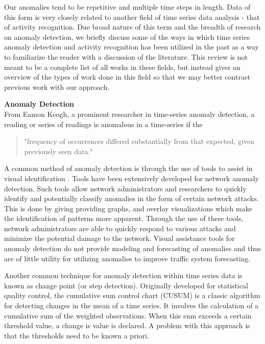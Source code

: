 Our anomalies tend to be repetitive and multiple time steps in length.  Data of this form is very closely related to another field of time series data analysis - that of activity recognition.   Due broad nature of this term and the breadth of research on anomaly detection, we briefly discuss some of the ways in which time series anomaly detection and activity recognition has been utilized in the past as a way to familiarize the reader with a discussion of the literature.  This review is not meant to be a complete list of all works in these fields, but instead gives an overview of the types of work done in this field so that we may better contrast previous work with our approach.

\bigskip
\noindent \textbf{Anomaly Detection} \\
From Eamon Keogh, a prominent researcher in time-series anomaly detection, a reading or series of readings is anomalous in a time-series if the 

\begin{quote}
"frequency of occurrences differed substantially from that expected, given previously seen data."
\end{quote}

A common method of anomaly detection is through the use of tools to assist in visual identification \cite{Stoffel2013, Lakhina2004, Shi2012}.  Tools have been extensively developed for network anomaly detection.  Such tools allow network administrators and researchers to quickly identify and potentially classify anomalies in the form of certain network attacks.  This is done by giving providing graphs, and overlay visualizations which make the identification of patterns more apparent.  Through the use of these tools, network administrators are able to quickly respond to  various attacks and minimize the potential damage to the network.  Visual assistance tools for anomaly detection do not provide modeling and forecasting of anomalies and thus are of little utility for utilizing anomalies to improve traffic system forecasting.   

Another common technique for anomaly detection within time series data is known as change point (or step detection).  Originally developed for statistical quality control, the cumulative sum control chart (CUSUM) \cite{page1955} is a classic algorithm for detecting changes in the mean of a time series.  It involves the calculation of a cumulative sum of the weighted observations.  When this sum exceeds a certain threshold value, a change is value is declared.  A problem with this approach is that the thresholds need to be known a priori.

